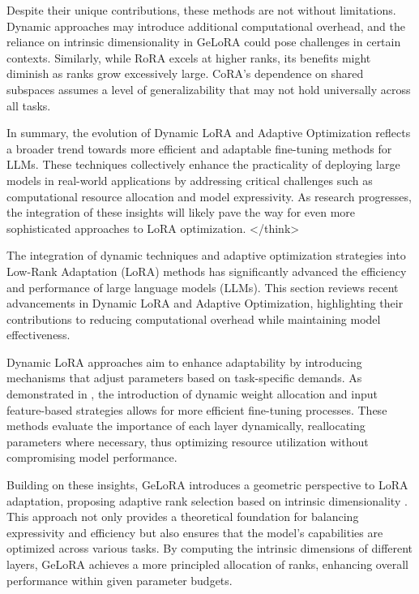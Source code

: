\documentclass[conference]{IEEEtran}
\begin{document}
Despite their unique contributions, these methods are not without limitations. Dynamic approaches may introduce additional computational overhead, and the reliance on intrinsic dimensionality in GeLoRA could pose challenges in certain contexts. Similarly, while RoRA excels at higher ranks, its benefits might diminish as ranks grow excessively large. CoRA's dependence on shared subspaces assumes a level of generalizability that may not hold universally across all tasks.

In summary, the evolution of Dynamic LoRA and Adaptive Optimization reflects a broader trend towards more efficient and adaptable fine-tuning methods for LLMs. These techniques collectively enhance the practicality of deploying large models in real-world applications by addressing critical challenges such as computational resource allocation and model expressivity. As research progresses, the integration of these insights will likely pave the way for even more sophisticated approaches to LoRA optimization.
</think>

The integration of dynamic techniques and adaptive optimization strategies into Low-Rank Adaptation (LoRA) methods has significantly advanced the efficiency and performance of large language models (LLMs). This section reviews recent advancements in Dynamic LoRA and Adaptive Optimization, highlighting their contributions to reducing computational overhead while maintaining model effectiveness.

Dynamic LoRA approaches aim to enhance adaptability by introducing mechanisms that adjust parameters based on task-specific demands. As demonstrated in \cite{b1}, the introduction of dynamic weight allocation and input feature-based strategies allows for more efficient fine-tuning processes. These methods evaluate the importance of each layer dynamically, reallocating parameters where necessary, thus optimizing resource utilization without compromising model performance.

Building on these insights, GeLoRA introduces a geometric perspective to LoRA adaptation, proposing adaptive rank selection based on intrinsic dimensionality \cite{b2}. This approach not only provides a theoretical foundation for balancing expressivity and efficiency but also ensures that the model's capabilities are optimized across various tasks. By computing the intrinsic dimensions of different layers, GeLoRA achieves a more principled allocation of ranks, enhancing overall performance within given parameter budgets.
\end{document}
